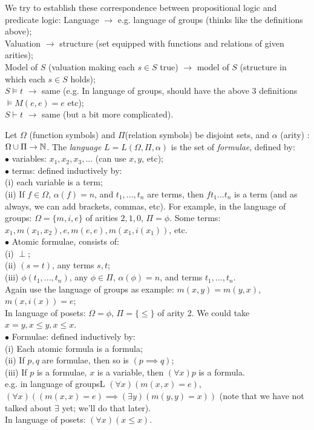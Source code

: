 \documentclass[a4paper]{article}
\begin{document}
We try to establish these correspondence between propositional logic and predicate logic:
Language $\to$ e.g. language of groups (thinks like the definitions above);\\
Valuation $\to$ structure (set equipped with functions and relations of given arities);\\
Model of $S$ (valuation making each $s \in S$ true) $\to$ model of $S$ (structure in which each $s \in S$ holds);\\
$S \vDash t$ $\to $ same (e.g. In language of groups, should have the above 3 definitions $\vDash M(e,e) = e$ etc);\\
$S \vdash t$ $\to $ same (but a bit more complicated).

Let $\Omega$ (function symbols) and $\Pi$(relation symbols) be disjoint sets, and $\alpha$ (arity) : $\Omega \cup \Pi \to \mathbb{N}$. The \emph{language} $L=L(\Omega,\Pi,\alpha)$ is the set of \emph{formulae}, defined by:\\
$\bullet$ variables: $x_1,x_2,x_3,...$ (can use $x,y$, etc);\\
$\bullet$ terms: defined inductively by:\\
(i) each variable is a term;\\
(ii) If $f \in \Omega$, $\alpha(f) = n$, and $t_1,...,t_n$ are terms, then $ft_1...t_n$ is a term (and as always, we can add brackets, commas, etc).
For example, in the language of groups: $\Omega = \{m,i,e\}$ of arities $2,1,0$, $\Pi = \phi$. Some terms: $x_1,m(x_1,x_2),e,m(e,e),m(x_1,i(x_1))$, etc.\\
$\bullet$ Atomic formulae, consists of:\\
(i) $\perp$;\\
(ii) $(s=t)$, any terms $s,t$;\\
(iii) $\phi(t_1,...,t_n)$, any $\phi \in \Pi$, $\alpha(\phi) = n$, and terms $t_1,...,t_n$.\\
Again use the language of groups as example: $m(x,y) = m(y,x)$, $m(x,i(x)) = e$;\\
In language of posets: $\Omega = \phi$, $\Pi = \{\leq\}$ of arity 2. We could take $x=y,x\leq y,x \leq x$.\\
$\bullet$ Formulae: defined inductively by:\\
(i) Each atomic formula is a formula;\\
(ii) If $p,q$ are formulae, then so is $(p \implies q)$;\\
(iii) If $p$ is a formulae, $x$ is a variable, then $(\forall x) p$ is a formula.\\
e.g. in language of groupsL $(\forall x)(m(x,x) = e)$, $(\forall x)((m(x,x) = e) \implies (\exists y)(m(y,y) = x))$ (note that we have not talked about $\exists$ yet; we'll do that later).\\
In language of posets: $(\forall x)(x \leq x)$.\\
\end{document}
